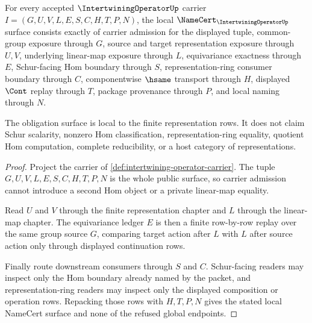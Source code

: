 \begin{theorem}
\label{thm:intertwining-operator-namecert-obligations}
For every accepted $\IntertwiningOperatorUp$ carrier $I=(G,U,V,L,E,S,C,H,T,P,N)$, the local $\NameCert_{\IntertwiningOperatorUp}$ surface consists exactly of carrier admission for the displayed tuple, common-group exposure through $G$, source and target representation exposure through $U,V$, underlying linear-map exposure through $L$, equivariance exactness through $E$, Schur-facing Hom boundary through $S$, representation-ring consumer boundary through $C$, componentwise $\hsame$ transport through $H$, displayed $\Cont$ replay through $T$, package provenance through $P$, and local naming through $N$.

The obligation surface is local to the finite representation rows. It does not claim Schur scalarity, nonzero Hom classification, representation-ring equality, quotient Hom computation, complete reducibility, or a host category of representations.
\end{theorem}
\begin{proof}
Project the carrier of \autoref{def:intertwining-operator-carrier}. The tuple $G,U,V,L,E,S,C,H,T,P,N$ is the whole public surface, so carrier admission cannot introduce a second Hom object or a private linear-map equality.

Read $U$ and $V$ through the finite representation chapter and $L$ through the linear-map chapter. The equivariance ledger $E$ is then a finite row-by-row replay over the same group source $G$, comparing target action after $L$ with $L$ after source action only through displayed continuation rows.

Finally route downstream consumers through $S$ and $C$. Schur-facing readers may inspect only the Hom boundary already named by the packet, and representation-ring readers may inspect only the displayed composition or operation rows. Repacking those rows with $H,T,P,N$ gives the stated local NameCert surface and none of the refused global endpoints.
\end{proof}


